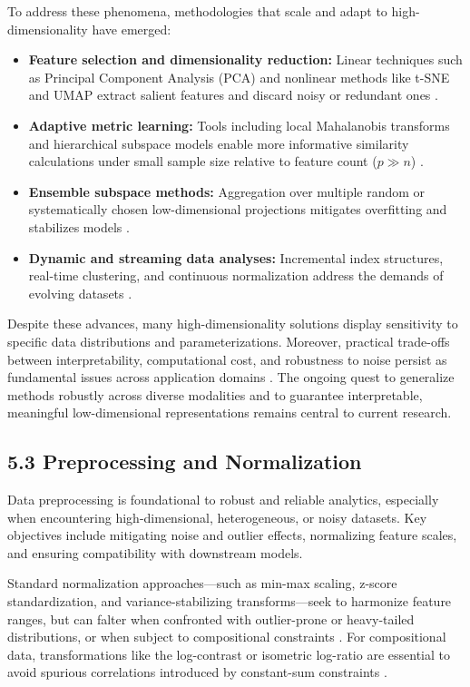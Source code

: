 \documentclass[11pt]{article}
\begin{document}
To address these phenomena, methodologies that scale and adapt to high-dimensionality have emerged:

\begin{itemize}
    \item \textbf{Feature selection and dimensionality reduction:} Linear techniques such as Principal Component Analysis (PCA) and nonlinear methods like t-SNE and UMAP extract salient features and discard noisy or redundant ones \cite{ref92,ref97,ref101}.
    \item \textbf{Adaptive metric learning:} Tools including local Mahalanobis transforms and hierarchical subspace models enable more informative similarity calculations under small sample size relative to feature count (\(p \gg n\)) \cite{ref64,ref92,ref93}.
    \item \textbf{Ensemble subspace methods:} Aggregation over multiple random or systematically chosen low-dimensional projections mitigates overfitting and stabilizes models \cite{ref116}.
    \item \textbf{Dynamic and streaming data analyses:} Incremental index structures, real-time clustering, and continuous normalization address the demands of evolving datasets \cite{ref76,ref79,ref80,ref94}.
\end{itemize}

Despite these advances, many high-dimensionality solutions display sensitivity to specific data distributions and parameterizations. Moreover, practical trade-offs between interpretability, computational cost, and robustness to noise persist as fundamental issues across application domains \cite{ref91,ref94,ref95}. The ongoing quest to generalize methods robustly across diverse modalities and to guarantee interpretable, meaningful low-dimensional representations remains central to current research.

\subsection{5.3 Preprocessing and Normalization}

Data preprocessing is foundational to robust and reliable analytics, especially when encountering high-dimensional, heterogeneous, or noisy datasets. Key objectives include mitigating noise and outlier effects, normalizing feature scales, and ensuring compatibility with downstream models.

Standard normalization approaches—such as min-max scaling, z-score standardization, and variance-stabilizing transforms—seek to harmonize feature ranges, but can falter when confronted with outlier-prone or heavy-tailed distributions, or when subject to compositional constraints \cite{ref60,ref65,ref66,ref67}. For compositional data, transformations like the log-contrast or isometric log-ratio are essential to avoid spurious correlations introduced by constant-sum constraints \cite{ref92,ref95}.
\end{document}

